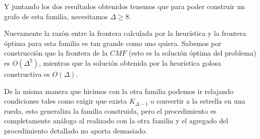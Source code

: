 Y juntando los dos resultados obtenidos tenemos que para poder construir un 
grafo de esta familia, necesitamos $\Delta \geq 8 $.

Nuevamente la raz\'on entre la frontera calculada por la heur\'istica y la frontera 
\'optima para esta familia es tan grande como uno quiera. Sabemos por construcci\'on 
que la frontera de la $CMF$ (esto es la soluci\'on \'optima del problema) es 
$O(\Delta^2)$, mientras que la soluci\'on obtenida por la heur\'istica golosa 
constructiva es $O(\Delta)$.

De la misma manera que hicimos con la otra familia podemos ir relajando condiciones
tales como exigir que exista $K_{\Delta -1}$ o convertir a la estrella en una rueda, 
esto generaliza la familia construida, pero el procedimiento es completamente an\'alogo
al realizado con la otra familia y el agregado del procedimiento detallado no aporta 
demasiado.

